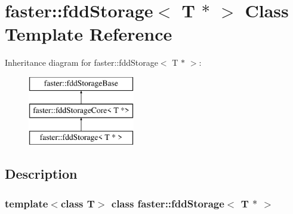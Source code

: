 \hypertarget{classfaster_1_1fddStorage_3_01T_01_5_01_4}{}\section{faster\+:\+:fdd\+Storage$<$ T $\ast$ $>$ Class Template Reference}
\label{classfaster_1_1fddStorage_3_01T_01_5_01_4}
Inheritance diagram for faster\+:\+:fdd\+Storage$<$ T $\ast$ $>$\+:\begin{figure}[H]
\begin{center}
\leavevmode
\includegraphics[height=3.000000cm]{classfaster_1_1fddStorage_3_01T_01_5_01_4}
\end{center}
\end{figure}


\subsection{Description}
\subsubsection*{template$<$class T$>$\newline
class faster\+::fdd\+Storage$<$ T $\ast$ $>$}

